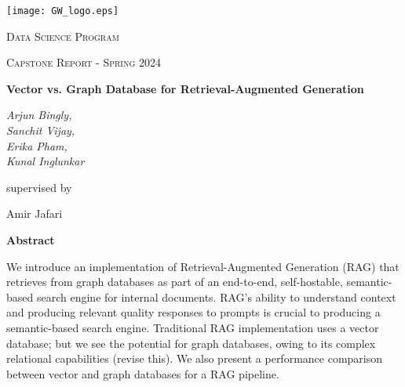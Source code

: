 \documentclass{scrartcl}
\renewenvironment{abstract}{
    \centering
    \textbf{Abstract}
    \vspace{0.5cm}
    \par\itshape
    \begin{minipage}{0.7\linewidth}}{\end{minipage}
    \noindent\ignorespaces
}
\begin{document}
\begin{titlepage}
	\centering
	\texttt{[image: GW\_logo.eps]}\par
	\vspace{2cm}
	{\scshape\LARGE Data Science Program \par}
	\vspace{1cm}
	{\scshape\Large Capstone Report - Spring 2024\par}
	\vspace{1.5cm}
	{\huge\bfseries Vector vs. Graph Database for Retrieval-Augmented Generation\par}
	\vspace{2cm}
	{\Large\itshape Arjun Bingly,\\ Sanchit Vijay,\\ Erika Pham,\\Kunal Inglunkar}\par
	\vspace{1.5cm}
	supervised by\par
	Amir Jafari

	\vfill
	\begin{abstract}
	    We introduce an implementation of Retrieval-Augmented Generation (RAG) that retrieves from graph databases as part of an end-to-end, self-hostable, semantic-based search engine for internal documents. RAG’s ability to understand context and producing relevant quality responses to prompts is crucial to producing a semantic-based search engine. Traditional RAG implementation uses a vector database; but we see the potential for graph databases, owing to its complex relational capabilities (revise this). We also present a performance comparison between vector and graph databases for a RAG pipeline. 
	\end{abstract}
	\vfill
\end{titlepage}
\tableofcontents
\newpage
\end{document}
